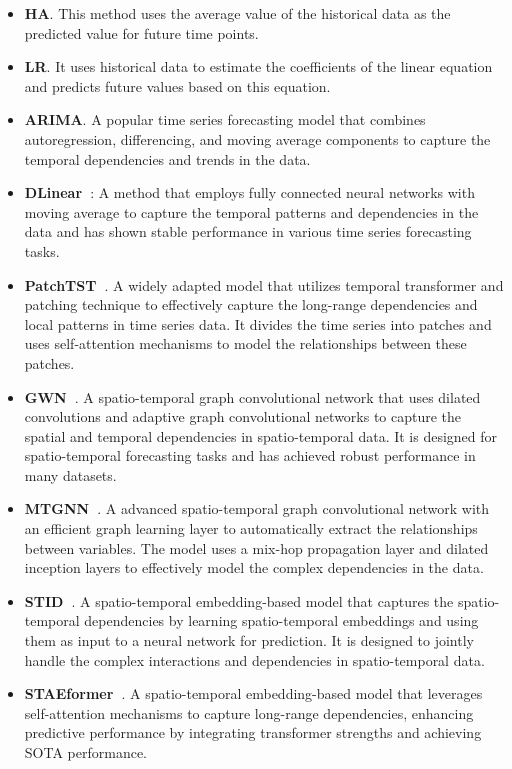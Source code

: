 \begin{itemize}[leftmargin=*]
\item \textbf{HA}. This method uses the average value of the historical data as the predicted value for future time points.
\item \textbf{LR}. It uses historical data to estimate the coefficients of the linear equation and predicts future values based on this equation.
\item \textbf{ARIMA}. A popular time series forecasting model that combines autoregression, differencing, and moving average components to capture the temporal dependencies and trends in the data.
\item \textbf{DLinear~\cite{zeng2023transformers}}: A method that employs fully connected neural networks with moving average to capture the temporal patterns and dependencies in the data and has shown stable performance in various time series forecasting tasks.
\item \textbf{PatchTST~\cite{nie2022time}}. A widely adapted model that utilizes temporal transformer and patching technique to effectively capture the long-range dependencies and local patterns in time series data. It divides the time series into patches and uses self-attention mechanisms to model the relationships between these patches.
\item \textbf{GWN~\cite{wu2019graph}}. A spatio-temporal graph convolutional network that uses dilated convolutions and adaptive graph convolutional networks to capture the spatial and temporal dependencies in spatio-temporal data. It is designed for spatio-temporal forecasting tasks and has achieved robust performance in many datasets.
\item \textbf{MTGNN~\cite{wu2020connecting}}. A advanced spatio-temporal graph convolutional network with an efficient graph learning layer to automatically extract the relationships between variables. The model uses a mix-hop propagation layer and dilated inception layers to effectively model the complex dependencies in the data.
\item \textbf{STID~\cite{shao2022spatial}}. A spatio-temporal embedding-based model that captures the spatio-temporal dependencies by learning spatio-temporal embeddings and using them as input to a neural network for prediction. It is designed to jointly handle the complex interactions and dependencies in spatio-temporal data.
\item \textbf{STAEformer~\cite{liu2023spatio}}. A spatio-temporal embedding-based model that leverages self-attention mechanisms to capture long-range dependencies, enhancing predictive performance by integrating transformer strengths and achieving SOTA performance.
\end{itemize}

